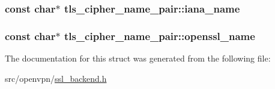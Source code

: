 \subsubsection[{iana\+\_\+name}]{\setlength{\rightskip}{0pt plus 5cm}const char$\ast$ tls\+\_\+cipher\+\_\+name\+\_\+pair\+::iana\+\_\+name}\label{structtls__cipher__name__pair_a2c888d6795e64bcc1ebf938eceaf4215}
\hypertarget{structtls__cipher__name__pair_af5581d7522ab6bde246c07a55b12a82a}{}
\subsubsection[{openssl\+\_\+name}]{\setlength{\rightskip}{0pt plus 5cm}const char$\ast$ tls\+\_\+cipher\+\_\+name\+\_\+pair\+::openssl\+\_\+name}\label{structtls__cipher__name__pair_af5581d7522ab6bde246c07a55b12a82a}


The documentation for this struct was generated from the following file\+:\begin{DoxyCompactItemize}
\item 
src/openvpn/\hyperlink{ssl__backend_8h}{ssl\+\_\+backend.\+h}\end{DoxyCompactItemize}
